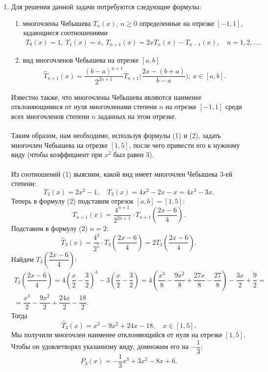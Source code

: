 \documentclass[a4paper, 12pt]{article}
\renewcommand{\geq}{\geqslant}
\begin{document}
\begin{enumerate}
		\newpage
		\item 
		\hypertarget{t2}{}
		Для решения данной задачи потребуются следующие формулы:
		\begin{enumerate}
			\item многочлены Чебышева $T_n(x)$, $n\geq 0$ определенные на отрезке $[-1,1]$, задающиеся соотношениями 
			\begin{eqnarray}
				T_0(x)=1,\ T_1(x) = x,\ T_{n+1}(x) = 2xT_n(x) - T_{n-1}(x),\quad n=1,2,\ldots.
			\end{eqnarray}
			\item вид многочленов Чебышева на отрезке $[a,b]$ 
			\begin{eqnarray}
				\hat T_{n+1}(x) = \dfrac{(b-a)^{n+1}}{2^{2n+1}} T_{n+1}\Big(\dfrac{2x - (b+a)}{b-a}\Big),\ x\in [a,b].
			\end{eqnarray}
		\end{enumerate}
		Известно также, что многочлены Чебышева являются наименее отклоняющимися от нуля многочленами степени $n$ на отрезке $[-1,1]$ среди всех многочленов степени $n$ заданных на этом отрезке.\\\\
		Таким образом, нам необходимо, используя формулы (1) и (2), задать многочлен Чебышева на отрезке $[1,5]$, после чего привести его к нужному виду (чтобы коэффициент при $x^2$ был равен 3).\\\\
		Из соотношений (1) выясним, какой вид имеет многочлен Чебышева 3-ей степени:
		$$T_2(x) = 2x^2 - 1,\quad T_3(x) = 4x^2 - 2x - x = 4x^3 - 3x.$$
		Теперь в формулу (2) подставим отрезок $[a,b] = [1,5]$:
		$$T_{n+1}(x) = \dfrac{4^{n+1}}{2^{2n + 1}}\cdot T_{n+1}\left(\dfrac{2x - 6}{4}\right).$$
		Подставим в формулу (2) $n=2$:
		$$\hat T_{3}(x) = \dfrac{4^{3}}{2^{5}}\cdot T_{3}\left(\dfrac{2x - 6}{4}\right)=2T_{3}\left(\dfrac{2x - 6}{4}\right).$$
		Найдем $T_{3}\left(\dfrac{2x - 6}{4}\right)$:
		\begin{multline*}
			T_{3}\left(\dfrac{2x - 6}{4}\right) = 4\left(\dfrac{x}{2} - \dfrac{3}{2}\right)^3 - 3\left(\dfrac{x}{2} - \dfrac{3}{2}\right) = 4\left(\dfrac{x^3}{8} - \dfrac{9x^2}{8} + \dfrac{27x}{8}-\dfrac{27}{8}\right) - \dfrac{3x}{2} + \dfrac{9}{2} =\\ = \dfrac{x^3}{2} - \dfrac{9x^2}{2} + \dfrac{24x}{2} - \dfrac{18}{2}.
		\end{multline*}
		Тогда $$\hat T_3(x) = x^3 - 9x^2 + 24x - 18,\quad x\in [1,5].$$
		Мы получили многочлен наименее отклоняющийся от нуля на отрезке $[1,5]$. Чтобы он удовлетворял указанному виду, домножим его на $-\dfrac13$:
		$$P_3(x) = -\dfrac13 x^3 + 3x^2 - 8x + 6.$$
		

\end{enumerate}
\end{document}
